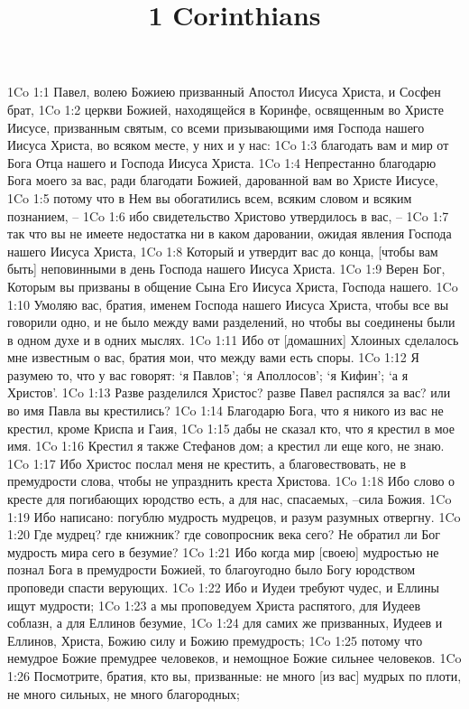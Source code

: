 

\title{1 Corinthians}

1Co 1:1  Павел, волею Божиею призванный Апостол Иисуса Христа, и Сосфен брат,
1Co 1:2  церкви Божией, находящейся в Коринфе, освященным во Христе Иисусе, призванным святым, со всеми призывающими имя Господа нашего Иисуса Христа, во всяком месте, у них и у нас:
1Co 1:3  благодать вам и мир от Бога Отца нашего и Господа Иисуса Христа.
1Co 1:4  Непрестанно благодарю Бога моего за вас, ради благодати Божией, дарованной вам во Христе Иисусе,
1Co 1:5  потому что в Нем вы обогатились всем, всяким словом и всяким познанием, --
1Co 1:6  ибо свидетельство Христово утвердилось в вас, --
1Co 1:7  так что вы не имеете недостатка ни в каком даровании, ожидая явления Господа нашего Иисуса Христа,
1Co 1:8  Который и утвердит вас до конца, [чтобы вам быть] неповинными в день Господа нашего Иисуса Христа.
1Co 1:9  Верен Бог, Которым вы призваны в общение Сына Его Иисуса Христа, Господа нашего.
1Co 1:10  Умоляю вас, братия, именем Господа нашего Иисуса Христа, чтобы все вы говорили одно, и не было между вами разделений, но чтобы вы соединены были в одном духе и в одних мыслях.
1Co 1:11  Ибо от [домашних] Хлоиных сделалось мне известным о вас, братия мои, что между вами есть споры.
1Co 1:12  Я разумею то, что у вас говорят: `я Павлов'; `я Аполлосов'; `я Кифин'; `а я Христов'.
1Co 1:13  Разве разделился Христос? разве Павел распялся за вас? или во имя Павла вы крестились?
1Co 1:14  Благодарю Бога, что я никого из вас не крестил, кроме Криспа и Гаия,
1Co 1:15  дабы не сказал кто, что я крестил в мое имя.
1Co 1:16  Крестил я также Стефанов дом; а крестил ли еще кого, не знаю.
1Co 1:17  Ибо Христос послал меня не крестить, а благовествовать, не в премудрости слова, чтобы не упразднить креста Христова.
1Co 1:18  Ибо слово о кресте для погибающих юродство есть, а для нас, спасаемых, --сила Божия.
1Co 1:19  Ибо написано: погублю мудрость мудрецов, и разум разумных отвергну.
1Co 1:20  Где мудрец? где книжник? где совопросник века сего? Не обратил ли Бог мудрость мира сего в безумие?
1Co 1:21  Ибо когда мир [своею] мудростью не познал Бога в премудрости Божией, то благоугодно было Богу юродством проповеди спасти верующих.
1Co 1:22  Ибо и Иудеи требуют чудес, и Еллины ищут мудрости;
1Co 1:23  а мы проповедуем Христа распятого, для Иудеев соблазн, а для Еллинов безумие,
1Co 1:24  для самих же призванных, Иудеев и Еллинов, Христа, Божию силу и Божию премудрость;
1Co 1:25  потому что немудрое Божие премудрее человеков, и немощное Божие сильнее человеков.
1Co 1:26  Посмотрите, братия, кто вы, призванные: не много [из вас] мудрых по плоти, не много сильных, не много благородных;
